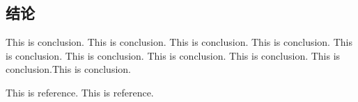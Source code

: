 \documentclass[hyperref]{ctexart}
\begin{document}
\begin{multicols}{2}
	\section{结论}
	This is conclusion. This is conclusion. This is conclusion. This is conclusion. This is conclusion. This is conclusion. This is conclusion. This is conclusion. This is conclusion.This is conclusion.
	
	\begin{thebibliography}{100}%
		This is reference.%
		This is reference.%
	\end{thebibliography}
	\end{multicols}
\end{document}
